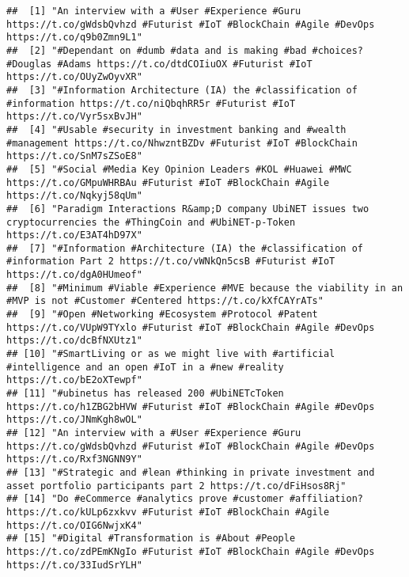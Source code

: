\documentclass[]{article}
\newenvironment{Shaded}{\begin{snugshade}}{\end{snugshade}}
\newcommand{\OperatorTok}[1]{\textcolor[rgb]{0.81,0.36,0.00}{\textbf{#1}}}
\newcommand{\NormalTok}[1]{#1}
\begin{document}
\begin{Shaded}
\end{Shaded}

\begin{verbatim}
##  [1] "An interview with a #User #Experience #Guru https://t.co/gWdsbQvhzd #Futurist #IoT #BlockChain #Agile #DevOps https://t.co/q9b0Zmn9L1"       
##  [2] "#Dependant on #dumb #data and is making #bad #choices? #Douglas #Adams https://t.co/dtdCOIiuOX #Futurist #IoT https://t.co/OUyZwOyvXR"      
##  [3] "#Information Architecture (IA) the #classification of #information https://t.co/niQbqhRR5r #Futurist #IoT https://t.co/Vyr5sxBvJH"          
##  [4] "#Usable #security in investment banking and #wealth #management https://t.co/NhwzntBZDv #Futurist #IoT #BlockChain https://t.co/SnM7sZSoE8" 
##  [5] "#Social #Media Key Opinion Leaders #KOL #Huawei #MWC https://t.co/GMpuWHRBAu #Futurist #IoT #BlockChain #Agile https://t.co/Nqkyj58qUm"     
##  [6] "Paradigm Interactions R&amp;D company UbiNET issues two cryptocurrencies the #ThingCoin and #UbiNET-p-Token https://t.co/E3AT4hD97X"        
##  [7] "#Information #Architecture (IA) the #classification of #information Part 2 https://t.co/vWNkQn5csB #Futurist #IoT https://t.co/dgA0HUmeof"  
##  [8] "#Minimum #Viable #Experience #MVE because the viability in an #MVP is not #Customer #Centered https://t.co/kXfCAYrATs"                      
##  [9] "#Open #Networking #Ecosystem #Protocol #Patent https://t.co/VUpW9TYxlo #Futurist #IoT #BlockChain #Agile #DevOps https://t.co/dcBfNXUtz1"    
## [10] "#SmartLiving or as we might live with #artificial #intelligence and an open #IoT in a #new #reality https://t.co/bE2oXTewpf"                
## [11] "#ubinetus has released 200 #UbiNETcToken https://t.co/h1ZBG2bHVW #Futurist #IoT #BlockChain #Agile #DevOps https://t.co/JNmKgh8wOL"          
## [12] "An interview with a #User #Experience #Guru https://t.co/gWdsbQvhzd #Futurist #IoT #BlockChain #Agile #DevOps https://t.co/Rxf3NGNN9Y"       
## [13] "#Strategic and #lean #thinking in private investment and asset portfolio participants part 2 https://t.co/dFiHsos8Rj"                       
## [14] "Do #eCommerce #analytics prove #customer #affiliation? https://t.co/kULp6zxkvv #Futurist #IoT #BlockChain #Agile https://t.co/OIG6NwjxK4"   
## [15] "#Digital #Transformation is #About #People https://t.co/zdPEmKNgIo #Futurist #IoT #BlockChain #Agile #DevOps https://t.co/33IudSrYLH"        

\end{verbatim}
\end{document}
